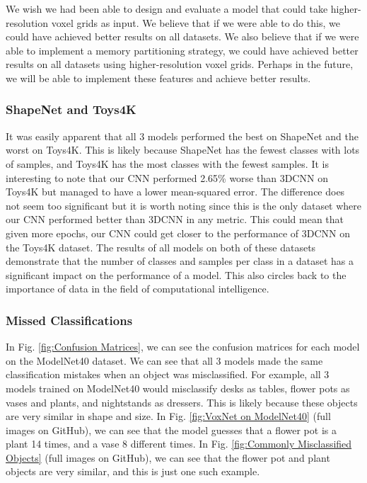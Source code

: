 \documentclass[conference]{IEEEtran}
\begin{document}
We wish we had been able to design and evaluate a model that could take higher-resolution voxel grids as input. We believe that if we were able to do this, we could have achieved better results on all datasets. We also believe that if we were able to implement a memory partitioning strategy, we could have achieved better results on all datasets using higher-resolution voxel grids. Perhaps in the future, we will be able to implement these features and achieve better results.

\subsubsection{ShapeNet and Toys4K}
It was easily apparent that all 3 models performed the best on ShapeNet and the worst on Toys4K. This is likely because ShapeNet has the fewest classes with lots of samples, and Toys4K has the most classes with the fewest samples. It is interesting to note that our CNN performed 2.65\% worse than 3DCNN on Toys4K but managed to have a lower mean-squared error. The difference does not seem too significant but it is worth noting since this is the only dataset where our CNN performed better than 3DCNN in any metric. This could mean that given more epochs, our CNN could get closer to the performance of 3DCNN on the Toys4K dataset. The results of all models on both of these datasets demonstrate that the number of classes and samples per class in a dataset has a significant impact on the performance of a model. This also circles back to the importance of data in the field of computational intelligence.

\subsubsection{Missed Classifications}
In Fig. \ref{fig:Confusion Matrices}, we can see the confusion matrices for each model on the ModelNet40 dataset. We can see that all 3 models made the same classification mistakes when an object was misclassified. For example, all 3 models trained on ModelNet40 would misclassify desks as tables, flower pots as vases and plants, and nightstands as dressers. This is likely because these objects are very similar in shape and size. In Fig. \ref{fig:VoxNet on ModelNet40} (full images on GitHub), we can see that the model guesses that a flower pot is a plant 14 times, and a vase 8 different times. In Fig. \ref{fig:Commonly Misclassified Objects} (full images on GitHub), we can see that the flower pot and plant objects are very similar, and this is just one such example.
\end{document}
